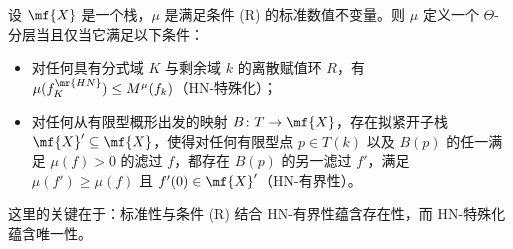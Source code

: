 \begin{thm}
    设 \(\mf{X}\) 是一个栈，\(\mu\) 是满足条件 (R) 的标准数值不变量。则 \(\mu\) 定义一个 \(\Theta\)-分层当且仅当它满足以下条件：
    \begin{itemize}
        \item 对任何具有分式域 \(K\) 与剩余域 \(k\) 的离散赋值环 \(R\)，有 \(\mu(f_K^{\mr{HN}}) \leq M^{\mu}(f_k)\)（HN-特殊化）；
        \item 对任何从有限型概形出发的映射 \(B \colon T \to \mf{X}\)，存在拟紧开子栈 \(\mf{X}' \subseteq \mf{X}\)，使得对任何有限型点 \(p \in T(k)\) 以及 \(B(p)\) 的任一满足 \(\mu(f) > 0\) 的滤过 \(f\)，都存在 \(B(p)\) 的另一滤过 \(f'\)，满足 \(\mu(f') \geq \mu(f)\) 且 \(f'(0) \in \mf{X}'\)（HN-有界性）。
    \end{itemize}
\end{thm}

这里的关键在于：标准性与条件 (R) 结合 HN-有界性蕴含存在性，而 HN-特殊化蕴含唯一性。
